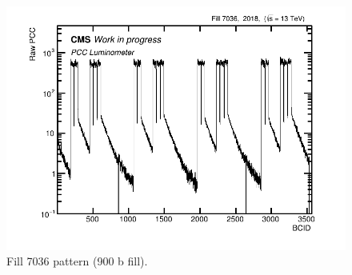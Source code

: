 \begin{figure}[!htp]
\centering
\includegraphics[width=1\textwidth]{ashish_thesis/fill_7036_pattern_2.png}
\caption[7036 Fill Patern]{%
  Fill 7036 pattern (900 b fill).
}
\label{fig:af_fit40}
\end{figure}






                                                                                                                                                                                       
